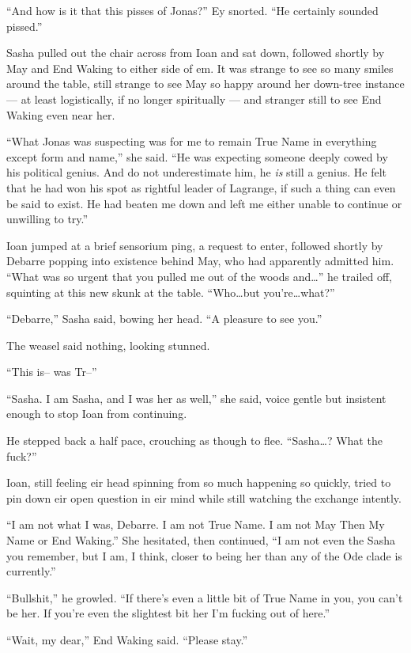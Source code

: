 ``And how is it that this pisses of Jonas?'' Ey snorted. ``He certainly sounded pissed.''

Sasha pulled out the chair across from Ioan and sat down, followed shortly by May and End Waking to either side of em. It was strange to see so many smiles around the table, still strange to see May so happy around her down-tree instance — at least logistically, if no longer spiritually — and stranger still to see End Waking even near her.

``What Jonas was suspecting was for me to remain True Name in everything except form and name,'' she said. ``He was expecting someone deeply cowed by his political genius. And do not underestimate him, he \emph{is} still a genius. He felt that he had won his spot as rightful leader of Lagrange, if such a thing can even be said to exist. He had beaten me down and left me either unable to continue or unwilling to try.''

Ioan jumped at a brief sensorium ping, a request to enter, followed shortly by Debarre popping into existence behind May, who had apparently admitted him. ``What was so urgent that you pulled me out of the woods and\ldots{}'' he trailed off, squinting at this new skunk at the table. ``Who\ldots but you're\ldots what?''

``Debarre,'' Sasha said, bowing her head. ``A pleasure to see you.''

The weasel said nothing, looking stunned.

``This is-- was Tr--''

``Sasha. I am Sasha, and I was her as well,'' she said, voice gentle but insistent enough to stop Ioan from continuing.

He stepped back a half pace, crouching as though to flee. ``Sasha\ldots? What the fuck?''

Ioan, still feeling eir head spinning from so much happening so quickly, tried to pin down eir open question in eir mind while still watching the exchange intently.

``I am not what I was, Debarre. I am not True Name. I am not May Then My Name or End Waking.'' She hesitated, then continued, ``I am not even the Sasha you remember, but I am, I think, closer to being her than any of the Ode clade is currently.''

``Bullshit,'' he growled. ``If there's even a little bit of True Name in you, you can't be her. If you're even the slightest bit her I'm fucking out of here.''

``Wait, my dear,'' End Waking said. ``Please stay.''

